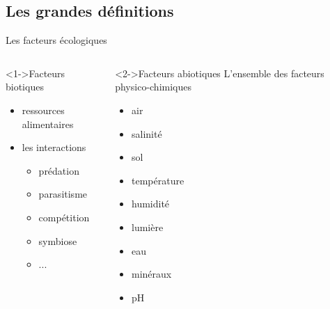 \documentclass[10pt]{beamer}
\begin{document}
\subsection{Les grandes définitions}


\begin{frame}{Les facteurs écologiques}
  \begin{columns}
    \begin{column}[c]{0.5\textwidth}
     \begin{block}<1->{Facteurs biotiques}
       \begin{itemize}
        \item ressources alimentaires
        \item les interactions
          \begin{itemize}
          \item prédation
          \item parasitisme
          \item compétition
          \item symbiose
          \item ...
          \end{itemize}
        \end{itemize}
    \end{block}
   \end{column}
    \begin{column}[c]{0.5\textwidth}
      \begin{block}<2->{Facteurs abiotiques}
        L'ensemble des facteurs physico-chimiques
        \begin{itemize}
        \item air
        \item salinité
        \item sol
        \item température
        \item humidité
        \item lumière
        \item eau
        \item minéraux
        \item pH
        \end{itemize}
    \end{block}
    \end{column}
  \end{columns}
\end{frame}
\end{document}

